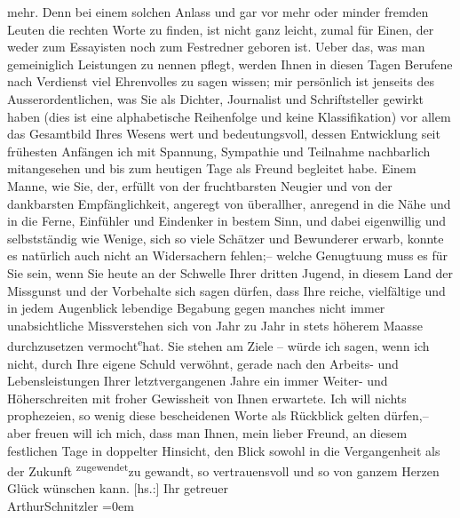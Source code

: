 \begin{ledgroupsized}[t]{13cm}
               mehr. Denn bei einem solchen Anlass und gar vor mehr oder minder fremden Leuten die
               rechten Worte zu finden, ist nicht ganz leicht, zumal für Einen, der weder zum
               Essayisten noch zum Festredner geboren ist.\pend
           \pstart
           Ueber das, was man gemeiniglich Leistungen zu nennen pflegt, werden Ihnen in diesen
               Tagen Berufene nach Verdienst viel Ehrenvolles zu sagen wissen; mir persönlich ist
                   jenseits 
               des Ausserordentlichen, was Sie als Dichter, Journalist und Schriftsteller gewirkt
               haben (dies ist eine alphabetische Reihenfolge und keine Klassifikation) {\pb}\introOben{}vor allem\introOben{} das Gesamtbild Ihres Wesens wert und
               bedeutungsvoll, dessen Entwicklung seit frühesten Anfängen ich mit Spannung,
               Sympathie und Teilnahme nachbarlich mitangesehen und bis zum heutigen Tage als Freund
               begleitet habe. Einem Manne, wie Sie, der, erfüllt von der fruchtbarsten Neugier und
               von der dankbarsten Empfänglichkeit, angeregt von überallher, anregend in die Nähe
               und in die Ferne, Einfühler und Eindenker in bestem Sinn, und dabei eigenwillig und
               selbstständig wie Wenige, sich so viele Schätzer und Bewunderer erwarb, konnte es
               natürlich auch nicht an Widersachern fehlen;– welche Genugtuung muss es für Sie sein,
               wenn Sie heute an der Schwelle Ihrer dritten Jugend, in diesem Land der Missgunst und
               der Vorbehalte sich sagen dürfen, dass Ihre reiche, vielfältige und in jedem
               Augenblick lebendige Begabung {\pb}gegen
               manches nicht immer unabsichtliche Missverstehen sich von Jahr zu Jahr in stets
               höherem Maasse durchzusetzen vermocht\substVorne{}\textsuperscript{e}\substDazwischen{}{ }hat\substHinten{}. Sie stehen am Ziele – würde ich sagen, wenn ich nicht, durch Ihre eigene
               Schuld verwöhnt, gerade nach den Arbeits- und Lebensleistungen Ihrer letztvergangenen
               Jahre ein immer Weiter- und Höherschreiten mit froher Gewissheit von Ihnen erwartete.
               Ich will nichts prophezeien, so wenig diese bescheidenen Worte als Rückblick gelten
               dürfen,– aber freuen  will ich mich, dass man
               Ihnen, mein lieber Freund, an diesem festlichen Tage in doppelter Hinsicht, den Blick
               sowohl in die Vergangenheit als der Zukunft \substVorne{}\textsuperscript{zugewendet}{\allowbreak}\substDazwischen{}zu gewandt\substHinten{}, so vertrauensvoll und so von ganzem Herzen Glück wünschen kann.\pend
           \pstart
           {[}hs.:{]} Ihr getreuer{\\[\baselineskip]}\spacefill\mbox{ArthurSchnitzler}\pend
           \leftskip=0em{}
         
         \endnumbering{}\end{ledgroupsized}  \newcommand{\dateiname}{L02950}\newcommand{\titel}{Arthur Schnitzler an Felix Salten, 29. 7. 1929}\newcommand{\editorInnen}{Martin Anton Müller und Laura Untner}
      